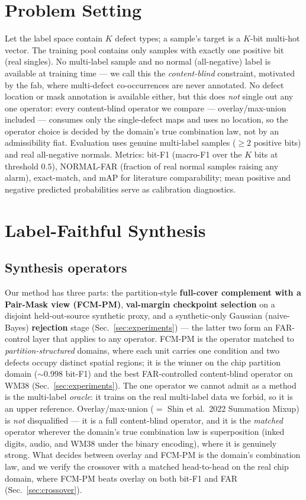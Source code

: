 \documentclass[11pt]{article}
\begin{document}
\section{Problem Setting}\label{sec:setting}

Let the label space contain $K$ defect types; a sample's target is a
$K$-bit multi-hot vector. The training pool contains only samples with
exactly one positive bit (real singles). No multi-label sample and no normal
(all-negative) label is available at training time --- we call this the
\emph{content-blind} constraint, motivated by the fab, where multi-defect
co-occurrences are never annotated. No defect location or mask annotation is
available either, but this does \emph{not} single out any one operator: every
content-blind operator we compare --- overlay/max-union included --- consumes only the
single-defect maps and uses no location, so the operator choice is decided by the
domain's true combination law, not by an admissibility fiat. Evaluation
uses genuine multi-label samples ($\geq 2$ positive bits) and real
all-negative normals. Metrics: bit-F1 (macro-F1 over the $K$ bits at
threshold $0.5$), NORMAL-FAR (fraction of real normal samples raising any
alarm), exact-match, and mAP for literature comparability; mean positive
and negative predicted probabilities serve as calibration diagnostics.

\section{Label-Faithful Synthesis}\label{sec:method}

\subsection{Synthesis operators}

Our method has three parts: the partition-style \textbf{full-cover complement with a
Pair-Mask view (FCM-PM)}, \textbf{val-margin checkpoint selection} on a disjoint
held-out-source synthetic proxy, and a synthetic-only Gaussian (naive-Bayes)
\textbf{rejection} stage (Sec.~\ref{sec:experiments}) --- the latter two form an
FAR-control layer that applies to any operator. FCM-PM is the operator matched to
\emph{partition-structured} domains, where each unit carries one condition and two
defects occupy distinct spatial regions; it is the winner on the chip partition domain
(${\sim}0.998$ bit-F1) and the best FAR-controlled content-blind operator on WM38
(Sec.~\ref{sec:experiments}). The one operator we cannot admit as a method is the
multi-label \emph{oracle}: it trains on the real multi-label data we forbid, so it is
an upper reference. Overlay/max-union ($=$ Shin et al.\ 2022 Summation Mixup) is
\emph{not} disqualified --- it is a full content-blind operator, and it is the
\emph{matched} operator wherever the domain's true combination law is superposition
(inked digits, audio, and WM38 under the binary encoding), where it is genuinely
strong. What decides between overlay and FCM-PM is the domain's combination law, and
we verify the crossover with a matched head-to-head on the real chip domain, where
FCM-PM beats overlay on both bit-F1 and FAR (Sec.~\ref{sec:crossover}).
\end{document}
